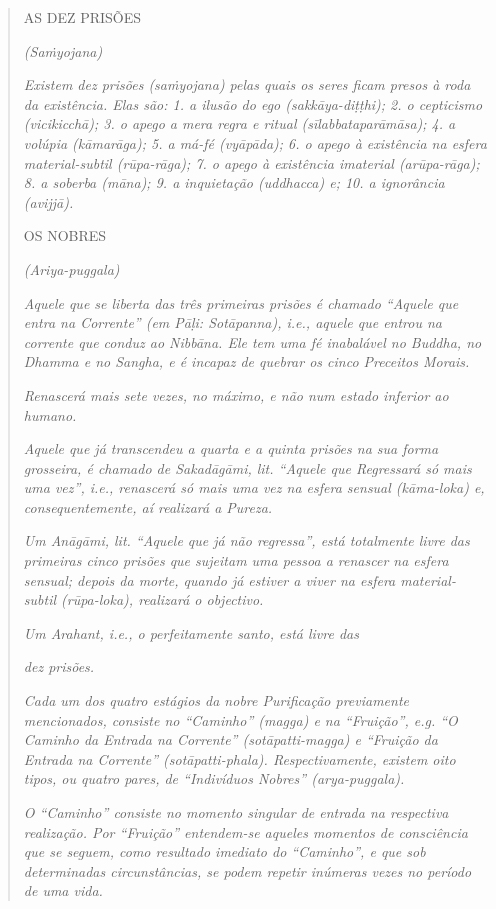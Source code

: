 \begin{quote}
AS DEZ PRISÕES

\emph{(Saṁyojana)}

\emph{Existem dez prisões (saṁyojana) pelas quais os seres ficam presos à roda da existência. Elas são: 1. a ilusão do ego (sakkāya-diṭṭhi); 2. o cepticismo (vicikicchā); 3. o apego a mera regra e ritual (sīlabbataparāmāsa); 4. a volúpia (kāmarāga); 5. a má-fé (vyāpāda); 6. o apego à existência na esfera material-subtil (rūpa-rāga); 7. o apego à existência imaterial (arūpa-rāga); 8. a soberba (māna); 9. a inquietação (uddhacca) e; 10. a ignorância (avijjā).}

OS NOBRES

\emph{(Ariya-puggala)}

\emph{Aquele que se liberta das três primeiras prisões é chamado ``Aquele que entra na Corrente'' (em Pāḷi: Sotāpanna), i.e., aquele que entrou na corrente que conduz ao Nibbāna. Ele tem uma fé inabalável no Buddha, no Dhamma e no Sangha, e é incapaz de quebrar os cinco Preceitos Morais.}

\emph{Renascerá mais sete vezes, no máximo, e não num estado inferior ao humano.}

\emph{Aquele que já transcendeu a quarta e a quinta prisões na sua forma grosseira, é chamado de Sakadāgāmi, lit. ``Aquele que Regressará só mais uma vez'', i.e., renascerá só mais uma vez na esfera sensual (kāma-loka) e, consequentemente, aí realizará a Pureza.}

\emph{Um Anāgāmi, lit. ``Aquele que já não regressa'', está totalmente livre das primeiras cinco prisões que sujeitam uma pessoa a renascer na esfera sensual; depois da morte, quando já estiver a viver na esfera material-subtil (rūpa-loka), realizará o objectivo.}

\emph{Um Arahant, i.e., o perfeitamente santo, está livre das}

\emph{dez prisões.}

\emph{Cada um dos quatro estágios da nobre Purificação previamente mencionados, consiste no ``Caminho'' (magga) e na ``Fruição'', e.g. ``O Caminho da Entrada na Corrente'' (sotāpatti-magga) e ``Fruição da Entrada na Corrente'' (sotāpatti-phala). Respectivamente, existem oito tipos, ou quatro pares, de ``Indivíduos Nobres'' (arya-puggala).}

\emph{O ``Caminho'' consiste no momento singular de entrada na respectiva realização. Por ``Fruição'' entendem-se aqueles momentos de consciência que se seguem, como resultado imediato do ``Caminho'', e que sob determinadas circunstâncias, se podem repetir inúmeras vezes no período de uma vida.}


\end{quote}
